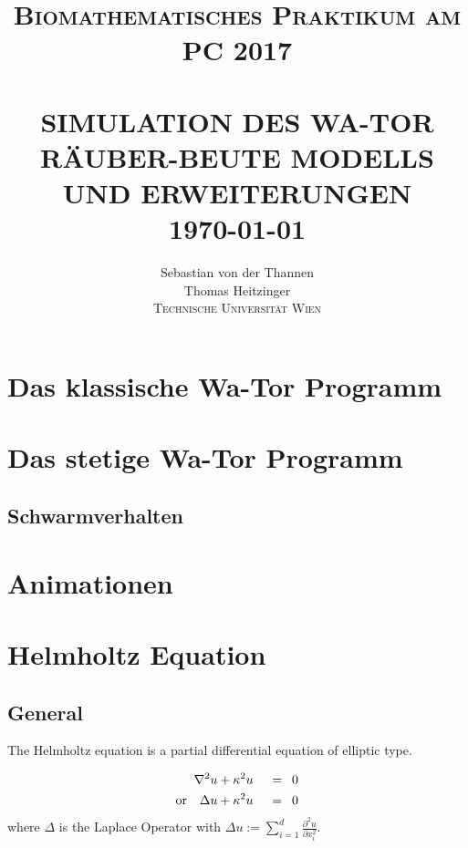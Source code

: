 \documentclass[a4paper,11pt]{article}
\title{ \normalsize \textsc{Biomathematisches Praktikum am PC 2017}    %
            \\[2.0cm]                   %
            \HRule{1pt} \\ [0.5cm]      %
            \LARGE \textbf{\uppercase{Simulation des Wa-Tor Räuber-Beute Modells und Erweiterungen}}    %
            \HRule{1pt} \\ [0.5cm]      %
            \normalsize \today          %
        }
\author{
	        Sebastian von der Thannen\\
	        Thomas Heitzinger\\
	        \vspace{10mm}
	        \textsc{Technische Universität Wien}\\
	}
\makeatletter
\theoremstyle{definition}
\numberwithin{equation}{section}
\def\printtitle{%
    {\centering \@title\par}}
\def\printauthor{%
    {\centering \large \@author}}
\makeatother
\begin{document}
	\thispagestyle{empty}       %

	\printtitle                 %
	\vfill
	\printauthor                %
	\newpage
	
	\tableofcontents
	\newpage
	

	\section{Das klassische Wa-Tor Programm}

	\section{Das stetige Wa-Tor Programm}
	\subsection{Schwarmverhalten}

	\section{Animationen}

	\section{Helmholtz Equation}
	
	\subsection{General}
	
	The Helmholtz equation is a partial differential equation of elliptic type. 
	
	\begin{alignat}{2} \label{eq:helmholtz}
		\nabla^2 u + \kappa^2 u \enspace &&= \enspace 0 \\
		\textnormal{or} \quad \Delta u + \kappa^2 u \enspace &&= \enspace 0 \nonumber
	\end{alignat}
	where $\Delta$ is the Laplace Operator with $ \Delta u := \sum_{i=1}^{d} \frac{\partial^2 u}{\partial x_i^2}$. \newline
	
\end{document}
